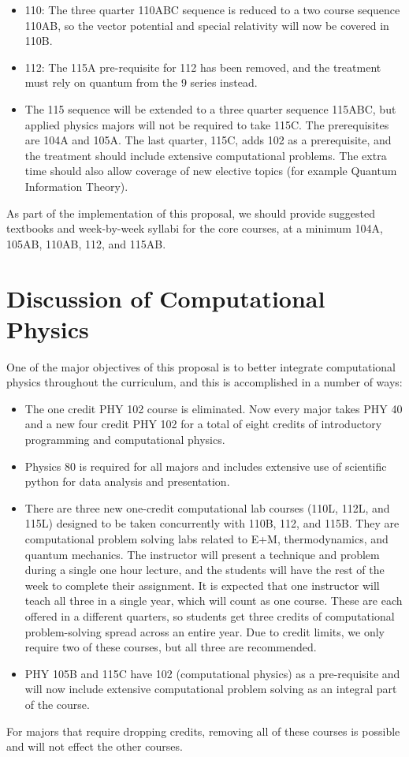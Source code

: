 \documentclass[12pt]{article}
\begin{document}
\begin{itemize}
\item 110:  The three quarter 110ABC sequence is reduced to a two course sequence 110AB, so the vector potential and special relativity will now be covered in 110B.

\item 112:  The 115A pre-requisite for 112 has been removed, and the treatment must rely on quantum from the 9 series instead.

\item The 115 sequence will be extended to a three quarter sequence 115ABC, but applied physics majors will not be required to take 115C.  The prerequisites are 104A and 105A.
The last quarter, 115C, adds 102 as a prerequisite, and the treatment should include extensive computational problems.  The extra time should also allow coverage of new elective topics (for example Quantum Information Theory).
\end{itemize}

As part of the implementation of this proposal, we should provide suggested textbooks and week-by-week syllabi for the core courses, at a minimum  104A, 105AB, 110AB, 112, and 115AB.

\section{Discussion of Computational Physics}

One of the major objectives of this proposal is to better integrate computational physics throughout the curriculum, and this is accomplished in a number of ways:
\begin{itemize}
\item The one credit PHY 102 course is eliminated.  Now every major takes PHY 40 and a new four credit PHY 102 for a total of eight credits of introductory programming and computational physics. 
\item Physics 80 is required for all majors and includes extensive use of scientific python for data analysis and presentation.
\item There are three new one-credit computational lab courses (110L, 112L, and 115L) designed to be taken concurrently with 110B, 112, and 115B. They are computational problem solving labs related to E+M, thermodynamics, and quantum mechanics.  The instructor will present a technique and problem during a single one hour lecture, and the students will have the rest of the week to complete their assignment.  It is expected that one instructor will teach all three in a single year, which will count as one course.
These are each offered in a different quarters, so students get three credits of computational problem-solving spread across an entire year.  Due to credit limits, we only require two of these courses, but all three are recommended.
\item PHY 105B and 115C have 102 (computational physics) as a pre-requisite and
will now include extensive computational problem solving as an integral part of the course.
\end{itemize}
For majors that require dropping credits, removing all of these courses is possible and will not effect the other courses.
\end{document}
